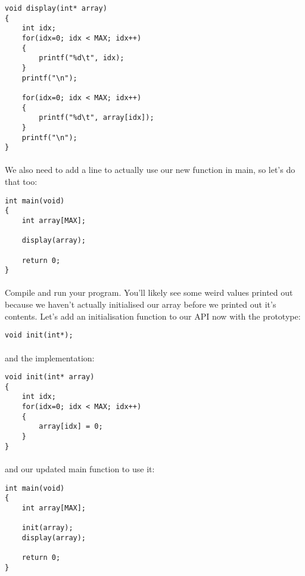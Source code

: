 \documentclass[10pt, a4paper, twosize]{article}
\begin{document}
\begin{lstlisting}
void display(int* array)
{
    int idx;
    for(idx=0; idx < MAX; idx++)
    {
        printf("%d\t", idx);
    }
    printf("\n");

    for(idx=0; idx < MAX; idx++)
    {
        printf("%d\t", array[idx]);
    }
    printf("\n");
}
\end{lstlisting}
\paragraph{} We also need to add a line to actually use our new function in main, so let's do that too:

\begin{lstlisting}
int main(void)
{
    int array[MAX];

    display(array);

    return 0;
}
\end{lstlisting}


\paragraph{} Compile and run your program. You'll likely see some weird values printed out because we haven't actually initialised our array before we printed out it's contents. Let's add an initialisation function to our API now with the prototype:

\begin{lstlisting}
void init(int*);
\end{lstlisting}

\paragraph{} and the implementation:

\begin{lstlisting}
void init(int* array)
{
    int idx;
    for(idx=0; idx < MAX; idx++)
    {
        array[idx] = 0;
    }
}
\end{lstlisting}

\paragraph{} and our updated main function to use it:

\begin{lstlisting}
int main(void)
{
    int array[MAX];

    init(array);
    display(array);

    return 0;
}
\end{lstlisting}
\end{document}
